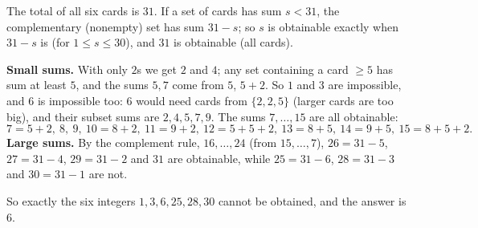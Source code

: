 The total of all six cards is $31$. If a set of cards has sum $s<31$, the complementary (nonempty) set has sum $31-s$; so $s$ is obtainable exactly when $31-s$ is (for $1\le s\le30$), and $31$ is obtainable (all cards).

\textbf{Small sums.} With only $2$s we get $2$ and $4$; any set containing a card $\ge5$ has sum at least $5$, and the sums $5,7$ come from $5$, $5+2$. So $1$ and $3$ are impossible, and $6$ is impossible too: $6$ would need cards from $\{2,2,5\}$ (larger cards are too big), and their subset sums are $2,4,5,7,9$. The sums $7,\dots,15$ are all obtainable:
\[
7=5+2,\ 8,\ 9,\ 10=8+2,\ 11=9+2,\ 12=5+5+2,\ 13=8+5,\ 14=9+5,\ 15=8+5+2 .
\]
\textbf{Large sums.} By the complement rule, $16,\dots,24$ (from $15,\dots,7$), $26=31-5$, $27=31-4$, $29=31-2$ and $31$ are obtainable, while $25=31-6$, $28=31-3$ and $30=31-1$ are not.

So exactly the six integers $1,3,6,25,28,30$ cannot be obtained, and the answer is $\boxed{6}$.
